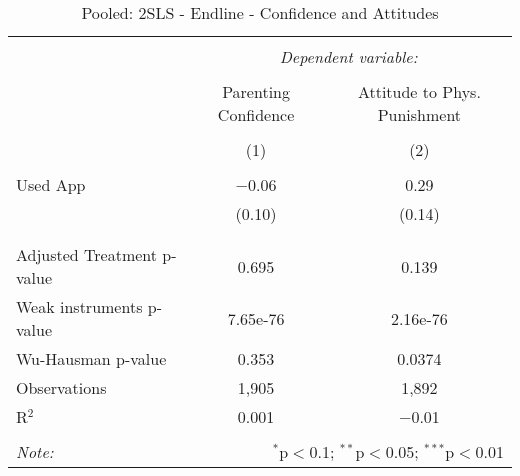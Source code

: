 
\begin{table}[!htbp] \centering 
  \caption{Pooled: 2SLS - Endline - Confidence and Attitudes} 
  \label{tbl:Pooled: 2SLS - Endline - Confidence and Attitudes} 
\begin{tabular}{@{\extracolsep{5pt}}lcc} 
\\[-1.8ex]\hline 
\hline \\[-1.8ex] 
 & \multicolumn{2}{c}{\textit{Dependent variable:}} \\ 
\cline{2-3} 
\\[-1.8ex] & Parenting Confidence & Attitude to Phys. Punishment \\ 
\\[-1.8ex] & (1) & (2)\\ 
\hline \\[-1.8ex] 
 Used App & $-$0.06 & 0.29 \\ 
  & (0.10) & (0.14) \\ 
  & & \\ 
\hline \\[-1.8ex] 
Adjusted Treatment p-value & 0.695 & 0.139 \\ 
Weak instruments p-value & 7.65e-76 & 2.16e-76 \\ 
Wu-Hausman p-value & 0.353 & 0.0374 \\ 
Observations & 1,905 & 1,892 \\ 
R$^{2}$ & 0.001 & $-$0.01 \\ 
\hline 
\hline \\[-1.8ex] 
\textit{Note:}  & \multicolumn{2}{r}{$^{*}$p$<$0.1; $^{**}$p$<$0.05; $^{***}$p$<$0.01} \\ 
\end{tabular} 
\end{table} 
